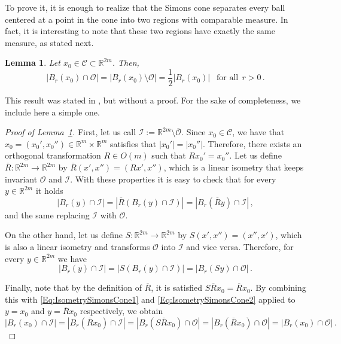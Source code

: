 \documentclass[twoside,leqno,symbols-for-thanks, draft]{rmi}
\numberwithin{equation}{section}
\newtheorem{lemma}[theorem]{Lemma}
\theoremstyle{definition}
\newcommand{\con}[1]{\mathbb{#1}}
\newcommand{\R}{\con{R}} %
\newcommand{\ccal}{\mathscr{C}}
\newcommand{\ical}{\mathcal{I}}
\newcommand{\ocal}{\mathcal{O}}
\begin{document}
To prove it, it is enough to realize that the Simons cone separates every ball centered at a point in the cone into two regions with comparable measure. In fact, it is interesting to note that these two regions have exactly the same measure, as stated next.

\begin{lemma}
	\label{Lemma:HalfBallSimonsCone}
	Let $x_0\in \ccal\subset \R^{2m}$. Then, 
	$$ | B_r(x_0)\cap \ocal| = | B_r(x_0)\setminus \ocal| = \frac{1}{2} |B_r(x_0)| \ \ \textrm{ for all} \ \ r>0\,. $$
\end{lemma}

This result was stated in \cite{Cabre-Saddle}, but without a proof. For the sake of completeness, we include here a simple one.

\begin{proof}[Proof of Lemma~\ref{Lemma:HalfBallSimonsCone}]
	First, let us call $\ical := \R^{2m}\setminus \overline{\ocal}$. Since $x_0\in \ccal$, we have that $x_0 = (x_0',x_0'')\in \R^m \times \R^m$ satisfies that $|x_0'|=|x_0''|$. Therefore, there exists an orthogonal transformation $R\in O(m)$ such that $R  x_0' = x_0''$. Let us define $\overline{R}:\R^{2m}\to\R^{2m}$ by $\overline{R}(x',x'') = (R x',x'')$, which is a linear isometry that keeps invariant $\ocal$ and $\ical$. With these properties it is easy to check that for every $y\in \R^{2m}$ it holds
	\begin{equation}
	\label{Eq:IsometrySimonsCone1}
	|B_r(y)\cap \ical| = |\overline{R} \left( B_r(y)\cap \ical\right)| = | B_r(\overline{R}y) \cap \ical |\,,
	\end{equation}
	and the same replacing $\ical$ with $\ocal$.
	
	On the other hand, let us define $S:\R^{2m}\to\R^{2m}$ by $S(x',x'') = (x'',x')$, which is also a linear isometry and transforms $\ocal$ into $\ical$ and vice versa. Therefore, for every $y\in \R^{2m}$ we have
	\begin{equation}
	\label{Eq:IsometrySimonsCone2}
	|B_r(y)\cap \ical| = |S \left( B_r(y)\cap \ical\right)| = | B_r(Sy) \cap \ocal |\,.
	\end{equation}
	
	Finally, note that by the definition of $\overline{R}$, it is satisfied $S\overline{R} x_0 = \overline{R} x_0$. By combining this with \eqref{Eq:IsometrySimonsCone1} and \eqref{Eq:IsometrySimonsCone2} applied to $y=x_0$ and $y=\overline{R}x_0$ respectively, we obtain
	$$ |B_r(x_0)\cap \ical| = | B_r(\overline{R}x_0) \cap \ical | = | B_r(S\overline{R}x_0) \cap \ocal | = | B_r(\overline{R}x_0) \cap \ocal | = |B_r(x_0)\cap \ocal|\,. $$
\end{proof}
\end{document}
